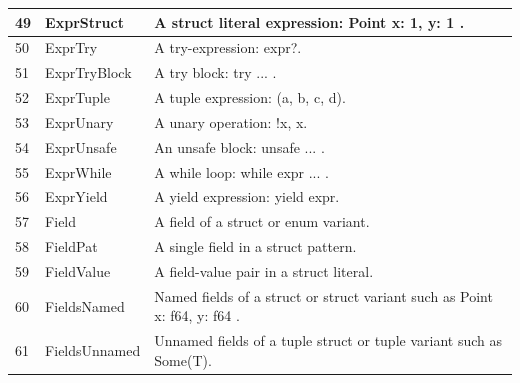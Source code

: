 \begin{longtable}{| p{} | p{} | p{} |}
49    & ExprStruct                     & A struct literal expression: Point { x: 1, y: 1 }.                                                             \\ \hline
50    & ExprTry                        & A try-expression: expr?.                                                                                       \\ \hline
51    & ExprTryBlock                   & A try block: try { ... }.                                                                                      \\ \hline
52    & ExprTuple                      & A tuple expression: (a, b, c, d).                                                                              \\ \hline
53    & ExprUnary                      & A unary operation: !x, \*x.                                                                                    \\ \hline
54    & ExprUnsafe                     & An unsafe block: unsafe { ... }.                                                                               \\ \hline
55    & ExprWhile                      & A while loop: while expr { ... }.                                                                              \\ \hline
56    & ExprYield                      & A yield expression: yield expr.                                                                                \\ \hline
57    & Field                          & A field of a struct or enum variant.                                                                           \\ \hline
58    & FieldPat                       & A single field in a struct pattern.                                                                            \\ \hline
59    & FieldValue                     & A field-value pair in a struct literal.                                                                        \\ \hline
60    & FieldsNamed                    & Named fields of a struct or struct variant such as Point { x: f64, y: f64 }.                                   \\ \hline
61    & FieldsUnnamed                  & Unnamed fields of a tuple struct or tuple variant such as Some(T).                                             \\ \hline

\end{longtable}
